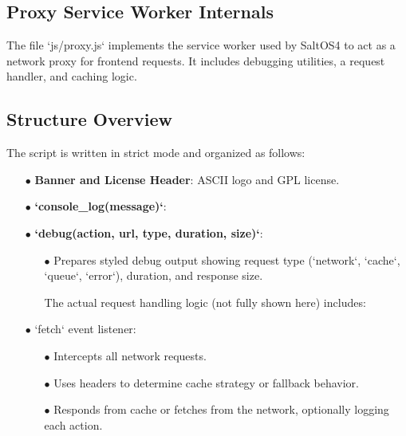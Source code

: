 \documentclass[a4paper]{article}
\begin{document}
\hypertarget{toc21}{}
\subsection{Proxy Service Worker Internals}

The file `js/proxy.js` implements the service worker used by SaltOS4 to act as a network proxy for frontend requests. It includes debugging utilities, a request handler, and caching logic.

\hypertarget{toc22}{}
\subsection*{Structure Overview}

The script is written in strict mode and organized as follows:

  \begin{itemize}
  \item[\color{myblue}$\bullet$] \textbf{Banner and License Header}: ASCII logo and GPL license.
  \item[\color{myblue}$\bullet$] \textbf{`console\_log(message)`}:
  \item[\color{myblue}$\bullet$] \textbf{`debug(action, url, type, duration, size)`}:
    \begin{itemize}
    \item[\color{myblue}$\bullet$] Prepares styled debug output showing request type (`network`, `cache`, `queue`, `error`), duration, and response size.

The actual request handling logic (not fully shown here) includes:

    \end{itemize}
  \item[\color{myblue}$\bullet$] `fetch` event listener:
    \begin{itemize}
    \item[\color{myblue}$\bullet$] Intercepts all network requests.
    \item[\color{myblue}$\bullet$] Uses headers to determine cache strategy or fallback behavior.
    \item[\color{myblue}$\bullet$] Responds from cache or fetches from the network, optionally logging each action.


\end{itemize}
\end{itemize}
\end{document}
